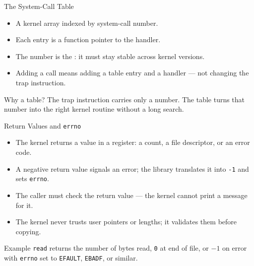 \documentclass[aspectratio=169]{beamer}
\begin{document}
\begin{frame}{The System-Call Table}
  \begin{itemize}
    \item A kernel array indexed by system-call number.
    \item Each entry is a function pointer to the handler.
    \item The number is the : it must stay stable across kernel
      versions.
    \item Adding a call means adding a table entry and a handler --- not
      changing the trap instruction.
  \end{itemize}
  \vspace{0.2cm}
  \begin{block}{Why a table?}
    The trap instruction carries only a number. The table turns that number
    into the right kernel routine without a long search.
  \end{block}
\end{frame}

\begin{frame}{Return Values and \texttt{errno}}
  \begin{itemize}
    \item The kernel returns a value in a register: a count, a file
      descriptor, or an error code.
    \item A negative return value signals an error; the library translates it
      into \texttt{-1} and sets \texttt{errno}.
    \item The caller must check the return value --- the kernel cannot print a
      message for it.
    \item The kernel never trusts user pointers or lengths; it validates them
      before copying.
  \end{itemize}
  \vspace{0.2cm}
  \begin{exampleblock}{Example}
    \texttt{read} returns the number of bytes read, \texttt{0} at end of file,
    or $-1$ on error with \texttt{errno} set to \texttt{EFAULT},
    \texttt{EBADF}, or similar.
  \end{exampleblock}
\end{frame}

\end{document}
